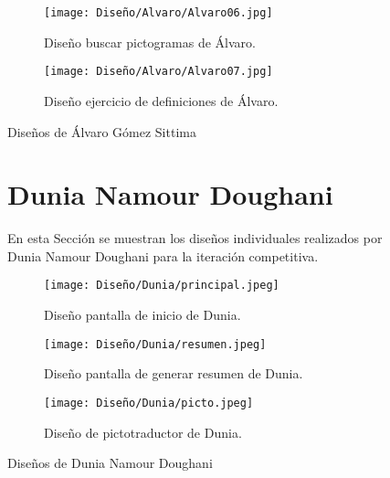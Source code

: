\begin{figure}[ht!]
  \ContinuedFloat

  \begin{subfigure}{\textwidth}
    \centering
    \texttt{[image: Diseño/Alvaro/Alvaro06.jpg]}
    \caption{Diseño buscar pictogramas de Álvaro.}
    \label{fig:disenyoAlvaro06}
  \end{subfigure}

  \begin{subfigure}{\textwidth}
    \centering
    \texttt{[image: Diseño/Alvaro/Alvaro07.jpg]}
    \caption{Diseño ejercicio de definiciones de Álvaro.}
    \label{fig:disenyoAlvaro07}
  \end{subfigure}

  \caption{Diseños de Álvaro Gómez Sittima}
  \label{fig:disenyoAlvaro}
\end{figure}


\begin{figure}[ht!]
  \section{Dunia Namour Doughani}
  En esta Sección se muestran los diseños individuales realizados por Dunia Namour Doughani para la iteración competitiva.
  \label{sec:disenyoDunia}
  \begin{subfigure}{\textwidth}
    \centering
    \texttt{[image: Diseño/Dunia/principal.jpeg]}
    \caption{Diseño pantalla de inicio de Dunia.}
    \label{dunia1}
  \end{subfigure}

  \begin{subfigure}{\textwidth}
    \centering
    \texttt{[image: Diseño/Dunia/resumen.jpeg]}
    \caption{Diseño pantalla de generar resumen de Dunia.}
    \label{dunia2}
  \end{subfigure}

  \begin{subfigure}{\textwidth}
    \centering
    \texttt{[image: Diseño/Dunia/picto.jpeg]}
    \caption{Diseño de pictotraductor de Dunia.}
    \label{dunia3}
  \end{subfigure}

  \caption{Diseños de Dunia Namour Doughani}
  \label{fig:disenyoDunia}
\end{figure}

